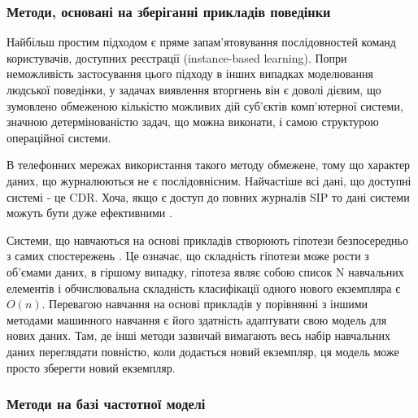 \subsubsection{Методи, основані на зберіганні прикладів поведінки}

Найбільш простим підходом є пряме запам'ятовування послідовностей
команд користувачів, доступних реєстрації (instance-based learning). Попри
неможливість застосування цього підходу в інших
випадках моделювання людської поведінки, у задачах виявлення вторгнень він є
доволі дієвим, що зумовлено обмеженою кількістю можливих дій суб'єктів
комп'ютерної системи, значною детермінованістю задач, що можна виконати, і
самою структурою операційної системи.

В телефонних мережах використання такого методу обмежене, тому що характер
даних, що журналюються не є послідовнісним. Найчастіше всі дані, що доступні
системі - це CDR. Хоча, якщо є доступ до повних журналів SIP то дані системи
можуть бути дуже ефективними \cite{niccolini2006sip}.

Системи, що навчаються на основі прикладів створюють гіпотези безпосередньо з
самих спостережень \cite{russell1995artificial}. Це означає, що складність
гіпотези може рости з об'ємами даних, в гіршому випадку, гіпотеза являє собою
список N навчальних елементів і обчислювальна складність класифікації одного
нового екземпляра є $O(n)$. Перевагою навчання на основі прикладів у
порівнянні з іншими методами машинного навчання є його здатність адаптувати свою
модель для нових даних. Там, де інші методи зазвичай вимагають весь набір
навчальних даних переглядати повністю, коли додається новий екземпляр, ця модель
може просто зберегти новий екземпляр.


\subsubsection{Методи на базі частотної моделі}

